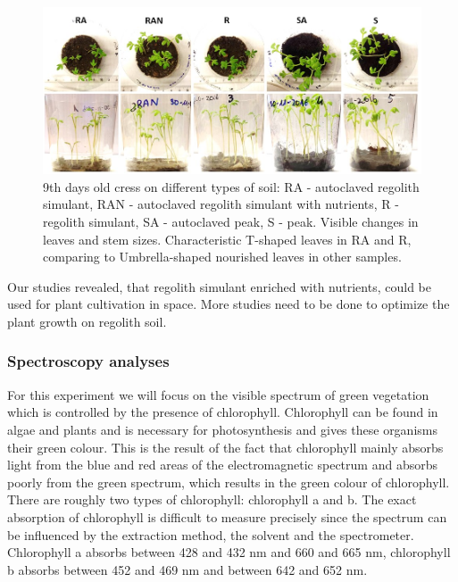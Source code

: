 \documentclass[preprint]{elsarticle}
\begin{document}
\begin{figure}
\centering
\includegraphics{img/figure12.png}
\caption{9th days old cress on different types of soil: RA - autoclaved regolith simulant, RAN - autoclaved regolith simulant with nutrients, R - regolith simulant, SA - autoclaved peak, S - peak. Visible changes in leaves and stem sizes. Characteristic T-shaped leaves in RA and R, comparing to Umbrella-shaped nourished leaves in other samples.}
\end{figure}

Our studies revealed, that regolith simulant enriched with nutrients, could be used for plant cultivation in space. More studies need to be done to optimize the plant growth on regolith soil.

\subsubsection{Spectroscopy analyses}
For this experiment we will focus on the visible spectrum of green vegetation which is controlled by the presence of chlorophyll. Chlorophyll can be found in algae and plants and is necessary for photosynthesis and gives these organisms their green colour. This is the result of the fact that chlorophyll mainly absorbs light from the blue and red areas of the electromagnetic spectrum and absorbs poorly from the green spectrum, which results in the green colour of chlorophyll. There are roughly two types of chlorophyll: chlorophyll a and b. The exact absorption of chlorophyll is difficult to measure precisely since the spectrum can be influenced by the extraction method, the solvent and the spectrometer. Chlorophyll a absorbs between 428 and 432 nm and 660 and 665 nm, chlorophyll b absorbs between 452 and 469 nm and between 642 and 652 nm.
\end{document}
